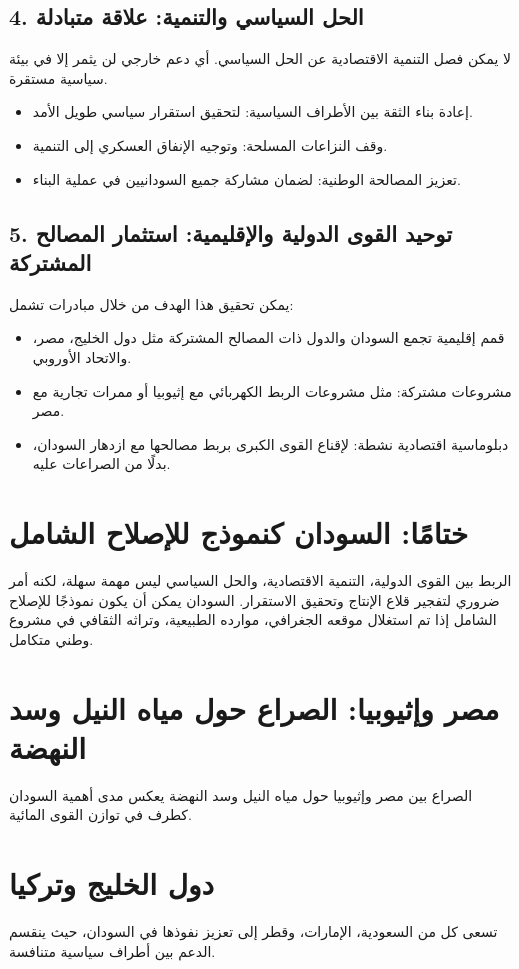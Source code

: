 \documentclass[12pt]{article}
\begin{document}
\subsection*{4. الحل السياسي والتنمية: علاقة متبادلة}
لا يمكن فصل التنمية الاقتصادية عن الحل السياسي. أي دعم خارجي لن يثمر إلا في بيئة سياسية مستقرة.
\begin{itemize}
    \item إعادة بناء الثقة بين الأطراف السياسية: لتحقيق استقرار سياسي طويل الأمد.
    \item وقف النزاعات المسلحة: وتوجيه الإنفاق العسكري إلى التنمية.
    \item تعزيز المصالحة الوطنية: لضمان مشاركة جميع السودانيين في عملية البناء.
\end{itemize}

\subsection*{5. توحيد القوى الدولية والإقليمية: استثمار المصالح المشتركة}
يمكن تحقيق هذا الهدف من خلال مبادرات تشمل:
\begin{itemize}
    \item قمم إقليمية تجمع السودان والدول ذات المصالح المشتركة مثل دول الخليج، مصر، والاتحاد الأوروبي.
    \item مشروعات مشتركة: مثل مشروعات الربط الكهربائي مع إثيوبيا أو ممرات تجارية مع مصر.
    \item دبلوماسية اقتصادية نشطة: لإقناع القوى الكبرى بربط مصالحها مع ازدهار السودان، بدلًا من الصراعات عليه.
\end{itemize}

\section*{ختامًا: السودان كنموذج للإصلاح الشامل}
الربط بين القوى الدولية، التنمية الاقتصادية، والحل السياسي ليس مهمة سهلة، لكنه أمر ضروري لتفجير قلاع الإنتاج وتحقيق الاستقرار. السودان يمكن أن يكون نموذجًا للإصلاح الشامل إذا تم استغلال موقعه الجغرافي، موارده الطبيعية، وتراثه الثقافي في مشروع وطني متكامل.



\section{مصر وإثيوبيا: الصراع حول مياه النيل وسد النهضة}
الصراع بين مصر وإثيوبيا حول مياه النيل وسد النهضة يعكس مدى أهمية السودان كطرف في توازن القوى المائية.

\section{دول الخليج وتركيا}
تسعى كل من السعودية، الإمارات، وقطر إلى تعزيز نفوذها في السودان، حيث ينقسم الدعم بين أطراف سياسية متنافسة.
\end{document}
